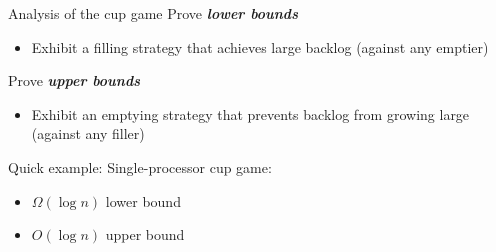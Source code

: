\documentclass[xcolor=x11names, svgnames, rgb]{beamer}
\newcommand{\defn}[1]       {{\textit{\textbf{\boldmath #1}}}}
\begin{document}
\begin{frame}[t]{Analysis of the cup game}
  Prove \defn{lower bounds}
  \begin{itemize}
    \item Exhibit a filling strategy that achieves large backlog (against any emptier)
  \end{itemize}
  Prove \defn{upper bounds} 
  \begin{itemize}
    \item Exhibit an emptying strategy that prevents backlog from growing large (against any filler) 
  \end{itemize}

  \vspace{1cm}
  Quick example: Single-processor cup game:
  \begin{itemize}
    \item $\Omega(\log n)$ lower bound
    \item $O(\log n)$ upper bound
  \end{itemize}
\end{frame}
\end{document}
